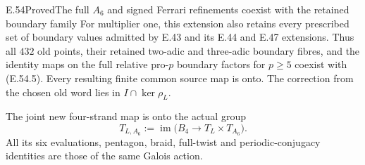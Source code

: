 \begin{statement}{E.54}{Proved}{The full $A_6$ and signed Ferrari refinements coexist with the retained boundary family}
For multiplier one, this extension also retains every
prescribed set of boundary values admitted by E.43 and
its E.44 and E.47 extensions.  Thus all $432$ old points,
their retained two-adic and three-adic boundary fibres,
and the identity maps on the full relative pro-$p$ boundary
factors for $p\ge5$ coexist with \textup{(E.54.5)}.
Every resulting finite common source map is onto.
The correction from the chosen old word lies in
$I\cap\ker\rho_L$.

The joint new four-strand map is onto the actual group
\[
 T_{L,A_6}:=\operatorname{im}
       \bigl(B_4\longrightarrow T_L\times T_{A_6}\bigr).
 \tag{E.54.6}
\]
All its six evaluations, pentagon, braid, full-twist and
periodic-conjugacy identities are those of the same
Galois action.
\end{statement}

